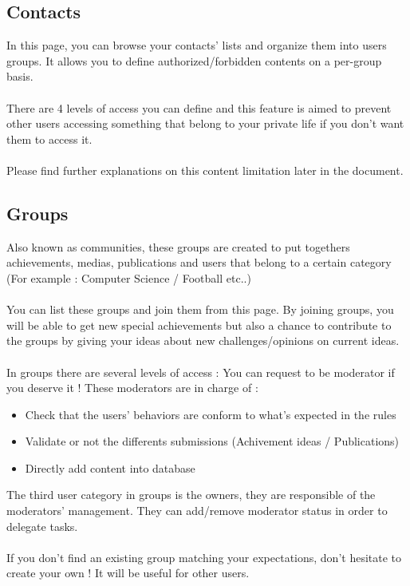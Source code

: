 \documentclass{life-en}
\begin{document}
\subsection{Contacts}

In this page, you can browse your contacts' lists and organize them into users groups. It allows you to define authorized/forbidden contents on a per-group basis.\\
\\
There are 4 levels of access you can define and this feature is aimed to prevent other users accessing something that belong to your private life if you don't want them to access it.\\
\\
Please find further explanations on this content limitation later in the document.

\subsection{Groups}

Also known as communities, these groups are created to put togethers achievements, medias, publications and users that belong to a certain category (For example : Computer Science / Football etc..)\\
\\
You can list these groups and join them from this page. By joining groups, you will be able to get new special achievements but also a chance to contribute to the groups by giving your ideas about new challenges/opinions on current ideas.\\
\\
In groups there are several levels of access : You can request to be moderator if you deserve it !
These moderators are in charge of :
\\
\begin{itemize}
\item Check that the users' behaviors are conform to what's expected in the rules
\item Validate or not the differents submissions (Achivement ideas / Publications)
\item Directly add content into database
\end{itemize}

The third user category in groups is the owners, they are responsible of the moderators' management. They can add/remove moderator status in order to delegate tasks.\\
\\
If you don't find an existing group matching your expectations, don't hesitate to create your own ! It will be useful for other users.
\end{document}
